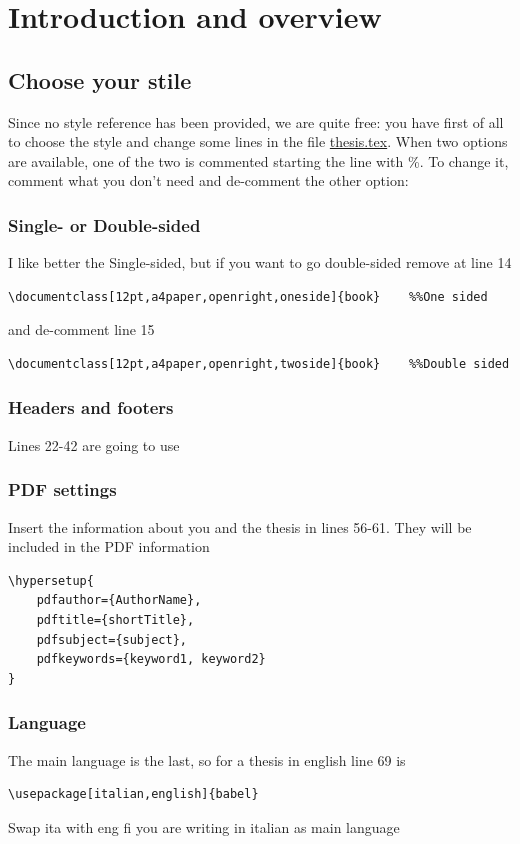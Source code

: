 \chapter{Introduction and overview}

\section{Choose your stile}

Since no style reference has been provided, we are quite free: you have first of all to choose the style and change some lines in the file \url{thesis.tex}. When two options are available, one of the two is commented starting the line with \%. To change it, comment what you don't need and de-comment the other option:

\subsection{Single- or Double-sided}
I like better the Single-sided, but if you want to go double-sided remove at line 14
\begin{verbatim}
\documentclass[12pt,a4paper,openright,oneside]{book}	%%One sided
\end{verbatim}
and de-comment line 15
\begin{verbatim}
\documentclass[12pt,a4paper,openright,twoside]{book}	%%Double sided
\end{verbatim}

\subsection{Headers and footers}
Lines 22-42 are going to use 


\subsection{PDF settings}
Insert the information about you and the thesis in lines 56-61. They will be included in the PDF information
\begin{verbatim}
\hypersetup{
    pdfauthor={AuthorName},
    pdftitle={shortTitle},
    pdfsubject={subject},
    pdfkeywords={keyword1, keyword2}
}
\end{verbatim}

\subsection{Language}
The main language is the last, so for a thesis in english line 69 is
\begin{verbatim}
\usepackage[italian,english]{babel} 
\end{verbatim}
Swap ita with eng fi you are writing in italian as main language




